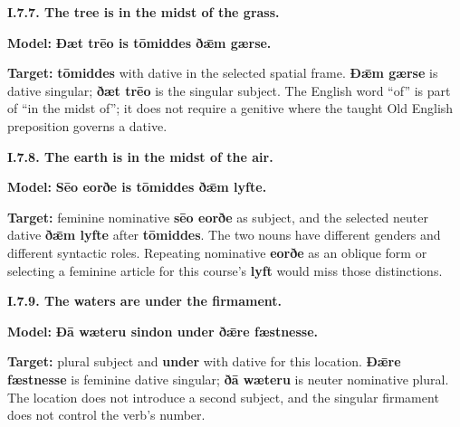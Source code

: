 \par\begin{minipage}{\linewidth}\raggedright
\textbf{I.7.7. The tree is in the midst of the grass.}

\textbf{Model:} \textbf{Ðæt trēo is tōmiddes ðǣm gærse.}

\textbf{Target:} \textbf{tōmiddes} with dative in the selected spatial frame. \textbf{Ðǣm gærse} is dative singular; \textbf{ðæt trēo} is the singular subject. The English word “of” is part of “in the midst of”; it does not require a genitive where the taught Old English preposition governs a dative.

\end{minipage}\par\addvspace{4pt}

\par\begin{minipage}{\linewidth}\raggedright
\textbf{I.7.8. The earth is in the midst of the air.}

\textbf{Model:} \textbf{Sēo eorðe is tōmiddes ðǣm lyfte.}

\textbf{Target:} feminine nominative \textbf{sēo eorðe} as subject, and the selected neuter dative \textbf{ðǣm lyfte} after \textbf{tōmiddes}. The two nouns have different genders and different syntactic roles. Repeating nominative \textbf{eorðe} as an oblique form or selecting a feminine article for this course’s \textbf{lyft} would miss those distinctions.

\end{minipage}\par\addvspace{4pt}

\par\begin{minipage}{\linewidth}\raggedright
\textbf{I.7.9. The waters are under the firmament.}

\textbf{Model:} \textbf{Ðā wæteru sindon under ðǣre fæstnesse.}

\textbf{Target:} plural subject and \textbf{under} with dative for this location. \textbf{Ðǣre fæstnesse} is feminine dative singular; \textbf{ðā wæteru} is neuter nominative plural. The location does not introduce a second subject, and the singular firmament does not control the verb’s number.

\end{minipage}\par\addvspace{4pt}

